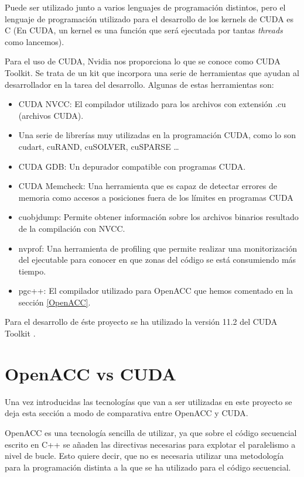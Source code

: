 Puede ser utilizado junto a varios lenguajes de programación distintos, pero el lenguaje de programación utilizado para el desarrollo de los kernels de CUDA es C (En CUDA, un kernel es una función que será ejecutada por tantas \textit{threads} como lancemos).

Para el uso de CUDA, Nvidia nos proporciona lo que se conoce como CUDA Toolkit. Se trata de un kit que incorpora una serie de herramientas que ayudan al desarrollador en la tarea del desarrollo. Algunas de estas herramientas son:

\begin{itemize}
    \item CUDA NVCC: El compilador utilizado para los archivos con extensión .cu (archivos CUDA).
    \item Una serie de librerías muy utilizadas en la programación CUDA, como lo son cudart, cuRAND, cuSOLVER, cuSPARSE \dots
    \item CUDA GDB: Un depurador compatible con programas CUDA.
    \item CUDA Memcheck: Una herramienta que es capaz de detectar errores de memoria como accesos a posiciones fuera de los límites en programas CUDA
    \item cuobjdump: Permite obtener información sobre los archivos binarios resultado de la compilación con NVCC.
    \item nvprof: Una herramienta de profiling que permite realizar una monitorización del ejecutable para conocer en que zonas del código se está consumiendo más tiempo.
    \item pgc++: El compilador utilizado para OpenACC que hemos comentado en la sección \ref{OpenACC}.
\end{itemize}

Para el desarrollo de éste proyecto se ha utilizado la versión 11.2 del CUDA Toolkit \cite{unknown-author-2021F}.

\section{OpenACC vs CUDA}

Una vez introducidas las tecnologías que van a ser utilizadas en este proyecto se deja esta sección a modo de comparativa entre OpenACC y CUDA.

OpenACC es una tecnología sencilla de utilizar, ya que sobre el código secuencial escrito en C++ se añaden las directivas necesarias para explotar el paralelismo a nivel de bucle. Esto quiere decir, que no es necesaria utilizar una metodología para la programación distinta a la que se ha utilizado para el código secuencial.

